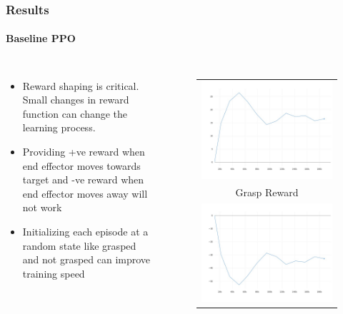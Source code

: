 \documentclass{beamer}
\begin{document}
	\begin{frame}
		\frametitle{Results}
		\framesubtitle{Baseline PPO}
		\begin{columns}[c]
			\begin{itemize}
				\item Reward shaping is critical. Small changes in reward function can change the learning process.
				\item Providing +ve reward when end effector moves towards target and -ve reward when end effector moves away will not work
				\item Initializing each episode at a random state like grasped and not grasped can improve training speed
			\end{itemize}
			
			\begin{figure}
				\begin{tabular}{c}
					\includegraphics[scale=0.15]{graph-grasp-reward.jpeg} \\
					{\small Grasp Reward} \\ \includegraphics[scale=0.15]{graph-drop-penalty.jpeg} \\

\end{tabular}
\end{figure}
\end{columns}
\end{frame}
\end{document}
